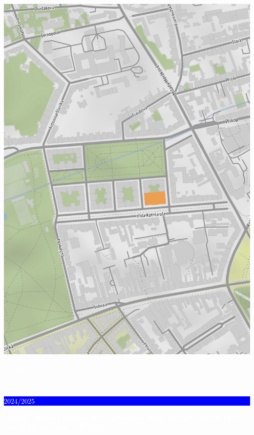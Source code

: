 \documentclass[a5paper, twoside]{article}
\begin{document}
\pagebreak
{}
\noindent\includegraphics[width=1.1\linewidth]{mapa.png}
\restoregeometry
\pagebreak

\pagestyle{empty}
\pagecolor{red}
\noindent\hspace{-3pt}\textcolor{white}{\fontsize{20}{20} \Kapitan Jaroška}

\vspace*{\fill}


\noindent\hspace{-3pt}\textcolor{white}{\fontsize{25}{25} \Kapitan Průvodce prváka. \colorbox{blue}{\rule[5pt]{0pt}{15pt}\large 2024/2025}}

\vspace{1em}

\noindent\textcolor{white}{\textbf{Vydáno Školním parlamentem Gymnázia Brno, tř. Kpt. Jaroše 14 v září 2024 nákladem 150 výtisků.}}
\end{document}

